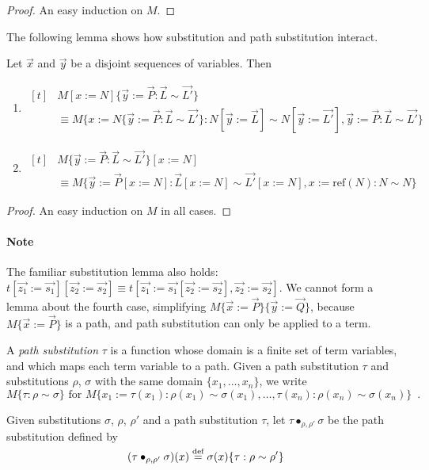 \documentclass[a4paper,UKenglish]{lipics-v2016}
\newcommand*{\eqdef}{\mathrel{\smash{\stackrel{\text{def}}{=}}}}
\newcommand*{\reff}[1]{\ensuremath{\mathrm{ref} \left( {#1} \right)}}
\theoremstyle{plain}
\begin{document}
\begin{proof}
An easy induction on $M$.
\end{proof}

The following lemma shows how substitution and path substitution interact.

\begin{lemma}[Substitution]
\label{lm:subpathsub}
Let $\vec{x}$ and $\vec{y}$ be a disjoint sequences of variables.  Then
\begin{enumerate}
\item
\label{lm:subpathsubi}
$ \begin{aligned}[t]
& M [ x:= N ] \{ \vec{y} := \vec{P} : \vec{L} \sim \vec{L'} \} \\
& \equiv M \{ x := N \{ \vec{y} := \vec{P} : \vec{L} \sim \vec{L'} \} : N [ \vec{y}:= \vec{L} ] \sim N [ \vec{y} := \vec{L'} ], \vec{y} := \vec{P} : \vec{L} \sim \vec{L'} \}
\end{aligned} $
\item
\label{lm:subpathsubii}
$ \begin{aligned}[t]
& M \{ \vec{y} := \vec{P} : \vec{L} \sim \vec{L'} \} [ x := N ] \\
& \equiv M \{ \vec{y} := \vec{P} [x := N] : \vec{L} [x := N] \sim \vec{L'} [x := N], x := \reff{N} : N \sim N \}
\end{aligned} $
\end{enumerate}
\end{lemma}

\begin{proof}
An easy induction on $M$ in all cases.
\end{proof}

\paragraph*{Note}
The familiar substitution lemma also holds: $t [\vec{z_1} := \vec{s_1}] [\vec{z_2} := \vec{s_2}] \equiv t [\vec{z_1} := \vec{s_1}[\vec{z_2} := \vec{s_2}], 
\vec{z_2} := \vec{s_2}]$.  We cannot form a lemma about the fourth case, simplifying $M \{ \vec{x} := \vec{P} \} \{ \vec{y} := \vec{Q} \}$, because
$M \{ \vec{x} := \vec{P} \}$ is a path, and path substitution can only be applied to a term.

\begin{definition}
A \emph{path substitution} $\tau$ is a function whose domain is a finite set of term variables,
and which maps each term variable to a path.  Given a path substitution $\tau$ and substitutions $\rho$, $\sigma$
with the same domain $\{ x_1, \ldots, x_n \}$, we write
\[ M \{ \tau : \rho \sim \sigma \} \text{ for } M \{ x_1 := \tau(x_1) : \rho(x_1) \sim \sigma(x_1), \ldots, \tau(x_n) : \rho(x_n) \sim \sigma(x_n) \} \enspace . \]

Given substitutions $\sigma$, $\rho$, $\rho'$ and a path substitution $\tau$, let $\tau \bullet_{\rho, \rho'} \sigma$ be the path substitution defined by
\[ (\tau \bullet_{\rho, \rho'} \sigma)(x) \eqdef \sigma(x)\{ \tau : \rho \sim \rho' \} \]
\end{definition}
\end{document}
